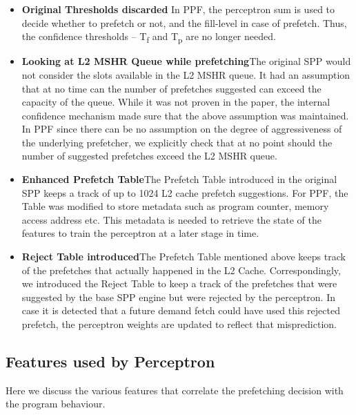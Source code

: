 \begin{itemize}
\item \textbf{Original Thresholds discarded}\newline 
  In PPF, the perceptron sum is used to decide whether to prefetch or not, 
  and the fill-level in case of prefetch. 
  Thus, the confidence thresholds --  T\textsubscript{f} and T\textsubscript{p} 
  are no longer needed.


\item \textbf{Looking at L2 MSHR Queue while prefetching}\newline The original
  SPP would not consider the slots available in the L2 MSHR queue.  It had an
  assumption that at no time can the number of prefetches suggested can
  exceed the capacity of the queue.  While it was not proven in the paper, the
  internal confidence mechanism made sure that the above assumption was maintained.  
  In PPF since there can be no assumption on the degree of aggressiveness of the 
  underlying prefetcher, we explicitly check that at no point should the number 
  of suggested prefetches exceed the L2 MSHR queue.

\item \textbf{Enhanced Prefetch Table}\newline The Prefetch Table introduced in the 
  original SPP keeps a track of up to 1024 L2 cache prefetch suggestions.  
  For PPF, the Table was modified to store metadata such as program counter, 
  memory access address etc.  This metadata is needed to retrieve the state 
  of the features to train the perceptron at a later stage in time.

\item \textbf{Reject Table introduced}\newline The Prefetch Table mentioned
  above keeps track of the prefetches that actually happened in the L2 Cache.
  Correspondingly, we introduced the Reject Table to keep a track of the
  prefetches that were suggested by the base SPP engine but were rejected by the
  perceptron.  In case it is detected that a future demand fetch could have used
  this rejected prefetch, the perceptron weights are updated to reflect that
  misprediction.

\end{itemize}


\subsection{Features used by Perceptron}
\label{Impl-Features}
Here we discuss the various features that correlate the prefetching decision
with the program behaviour.

